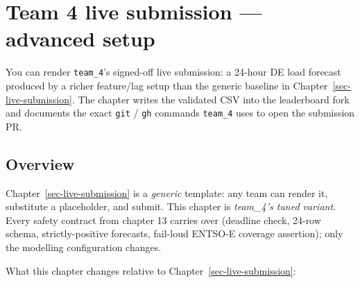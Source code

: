 \documentclass[
  english,
  letterpaper,
]{scrbook}
\begin{document}

\chapter{Team 4 live submission --- advanced
setup}\label{sec-team4-submission}

\begin{tcolorbox}[enhanced jigsaw, arc=.35mm, bottomrule=.15mm, bottomtitle=1mm, breakable, colback=white, colbacktitle=quarto-callout-note-color!10!white, colframe=quarto-callout-note-color-frame, coltitle=black, left=2mm, leftrule=.75mm, opacityback=0, opacitybacktitle=0.6, rightrule=.15mm, title=\textcolor{quarto-callout-note-color}{\faInfo}\hspace{0.5em}{Learning objective}, titlerule=0mm, toprule=.15mm, toptitle=1mm]

You can render \texttt{team\_4}'s signed-off live submission: a 24-hour
DE load forecast produced by a richer feature/lag setup than the generic
baseline in Chapter~\ref{sec-live-submission}. The chapter writes the
validated CSV into the leaderboard fork and documents the exact
\texttt{git} / \texttt{gh} commands \texttt{team\_4} uses to open the
submission PR.

\end{tcolorbox}

\section{Overview}\label{sec-team4-overview}

Chapter~\ref{sec-live-submission} is a \emph{generic} template: any team
can render it, substitute a placeholder, and submit. This chapter is
\emph{team\_4's tuned variant}. Every safety contract from chapter 13
carries over (deadline check, 24-row schema, strictly-positive
forecasts, fail-loud ENTSO-E coverage assertion); only the modelling
configuration changes.

What this chapter changes relative to Chapter~\ref{sec-live-submission}:
\end{document}

